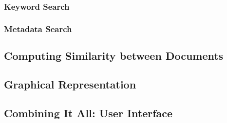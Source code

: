 \subsubsection{Keyword Search}\label{sec:keyword_search}

\subsubsection{Metadata Search}\label{sec:metadata_search}

\subsection{Computing Similarity between Documents}\label{sec:computing_similarity_between_documents}

\subsection{Graphical Representation}\label{sec:graphical_representation}

	
\subsection{Combining It All: User Interface}\label{sec:combining_it_all:_user_interface}
